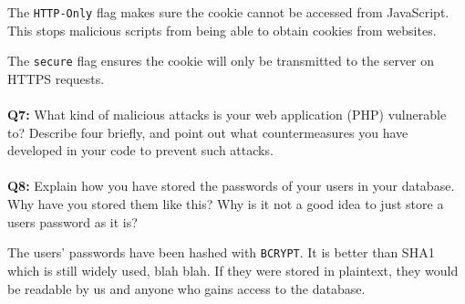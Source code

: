 The \verb/HTTP-Only/ flag makes sure the cookie cannot be accessed from JavaScript. This stops malicious scripts from being able to obtain cookies from websites.

The \verb/secure/ flag ensures the cookie will only be transmitted to the server on HTTPS requests.

\paragraph{}
\textbf{Q7:}
What kind of malicious attacks is your web application (PHP) vulnerable to? Describe four briefly, and point out what countermeasures you have developed in your code to prevent such attacks.

\paragraph{}
\textbf{Q8:}
Explain how you have stored the passwords of your users in your database. Why have you stored them like this? Why is it not a good idea to just store a users password as it is?

The users' passwords have been hashed with \verb/BCRYPT/.
It is better than SHA1 which is still widely used, blah blah.
If they were stored in plaintext, they would be readable by us and anyone who gains access to the database.

